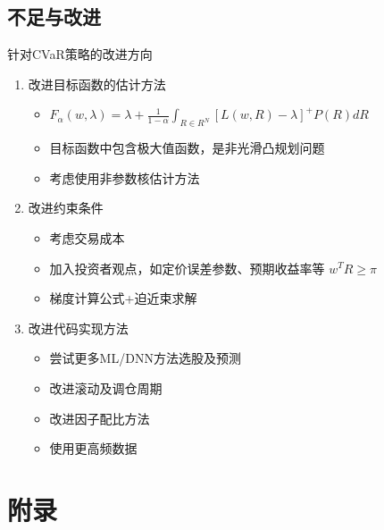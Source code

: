 \documentclass[CJK,aspectratio=43]{beamer}  %
\begin{document}
\subsection{不足与改进}
\begin{frame}{针对CVaR策略的改进方向}
	\begin{enumerate}
		\item 改进目标函数的估计方法
		\begin{itemize}
			\item $F_{\alpha}(w,\lambda)=\lambda+\frac{1}{1-\alpha}\int_{R\in R^N}[L(w,R)-\lambda]^{+}P(R)dR$
			\item 目标函数中包含极大值函数，是非光滑凸规划问题
			\item 考虑使用非参数核估计方法
			\cite{Huang2014}
		\end{itemize}
		\item 改进约束条件
		\begin{itemize}
			\item 考虑交易成本
			\item 加入投资者观点，如定价误差参数、预期收益率等 $w^TR\geq \pi$
			\item 梯度计算公式+迫近束求解
			\cite{Huang2022}
		\end{itemize}
		\item  改进代码实现方法
		\begin{itemize}
			\item 尝试更多ML/DNN方法选股及预测
			\item 改进滚动及调仓周期
			\item 改进因子配比方法
			\item 使用更高频数据
		\end{itemize}
	\end{enumerate}
\end{frame}

\section{附录}
\end{document}
